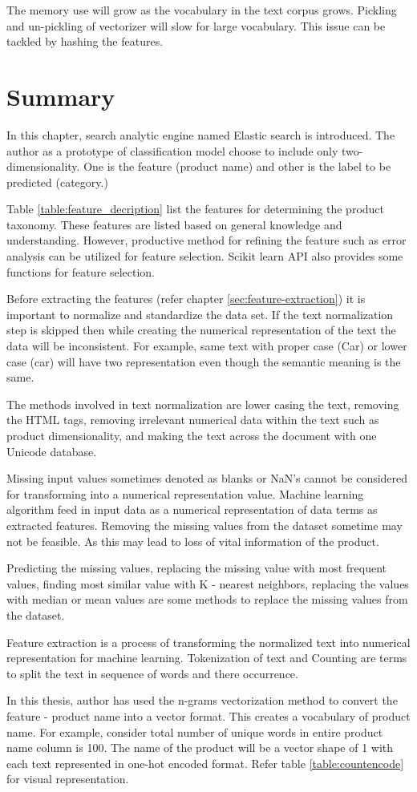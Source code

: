 The memory use will grow as the vocabulary in the text corpus grows.  Pickling and un-pickling of vectorizer will slow for large vocabulary.
This issue can be tackled by hashing the features. 

\section{Summary}

In this chapter, search analytic engine named Elastic search is introduced. The author as a prototype of classification model choose to include only two-dimensionality. One is the feature (product name) and other is the label to be predicted (category.)

Table \ref{table:feature_decription} list the features for determining the product taxonomy. These features are listed based on general knowledge and understanding. However, productive method for refining the feature such as error analysis can be utilized for feature selection. Scikit learn API \parencite{sklearn_api} also provides some functions for feature selection.

Before extracting the features (refer chapter \ref{sec:feature-extraction}) it is important to normalize and standardize the data set. If the text normalization step is skipped then while creating the numerical representation of the text the data will be inconsistent. For example, same text with proper case (Car) or lower case (car) will have two representation even though the semantic meaning is the same.  

The methods involved in text normalization are lower casing the text, removing the HTML tags, removing irrelevant numerical data within the text such as product dimensionality, and making the text across the document with one Unicode database.

Missing input values sometimes denoted as blanks or NaN's cannot be considered for transforming into a numerical representation value. Machine learning algorithm feed in input data as a numerical representation of data terms as extracted features. Removing the missing values from the dataset sometime may not be feasible. As this may lead to loss of vital information of the product. 

Predicting the missing values, replacing the missing value with most frequent values, finding most similar value with K - nearest neighbors, replacing the values with median or mean values are some methods to replace the missing values from the dataset.


Feature extraction is a process of transforming the normalized text into numerical representation for machine learning.  Tokenization of text and Counting are terms to split the text in sequence of words and there occurrence. 

In this thesis, author has used the n-grams vectorization method to convert the feature - product name into a vector format. This creates a vocabulary of product name. For example, consider total number of unique words in entire product name column is 100. The name of the product will be a vector shape of 1  with each text represented in one-hot encoded format. Refer table \ref{table:countencode} for visual representation.
